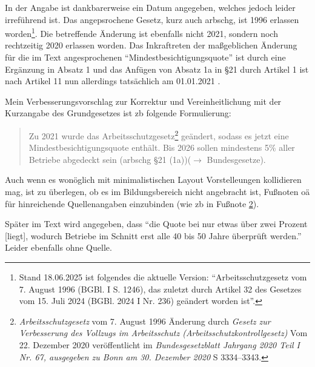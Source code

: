 In der Angabe ist dankbarerweise ein Datum angegeben, welches jedoch leider irreführend ist. Das angepsrochene Gesetz, kurz auch \gls{arbschg}, ist 1996 erlassen worden\footnote{Stand 18.06.2025 ist folgendes die aktuelle Version: \enquote{Arbeitsschutzgesetz vom 7. August 1996 (BGBl. I S. 1246), das zuletzt durch Artikel 32 des Gesetzes vom 15. Juli 2024 (BGBl. 2024 I Nr. 236) geändert worden ist}.}. Die betreffende Änderung ist ebenfalls nicht 2021, sondern noch rechtzeitig 2020 erlassen worden. Das Inkraftreten der maßgeblichen Änderung für die im Text angesprochenen \enquote{Mindestbesichtigungsquote} ist durch eine Ergänzung in Absatz 1 und das Anfügen von Absatz 1a in §21 %
durch Artikel 1 ist nach Artikel 11 nun allerdings tatsächlich am 01.01.2021 \autocite[3334–3343]{BGBl.2020-I-Nr67}. 

Mein Verbesserungsvorschlag zur Korrektur und Vereinheitlichung mit der Kurzangabe des Grundgesetzes ist \gls{zb} folgende Formulierung:
\begin{quote}
Zu 2021 wurde das Arbeitsschutzgesetz\footnote{
    \emph{Arbeitsschutzgesetz} vom 7. August 1996 Änderung durch \emph{Gesetz zur Verbesserung des Vollzugs im Arbeitsschutz (Arbeitsschutzkontrollgesetz)} Vom 22. Dezember 2020 veröffentlicht im \emph{Bundesgesetzblatt Jahrgang 2020 Teil I Nr. 67, ausgegeben zu Bonn am 30. Dezember 2020} \gls{S} 3334–3343.\label{ArbschSchGfooty}} 
    geändert, sodass es jetzt eine Mindestbesichtigungsquote enthält. %
    Bis 2026 sollen mindestens 5\% aller Betriebe abgedeckt sein (\gls{arbschg} §21 (1a))($\rightarrow$ Bundesgesetze). 
\end{quote}

Auch wenn es wonöglich mit minimalistischen Layout Vorstelleungen kollidieren mag, ist zu überlegen, ob es im Bildungsbereich nicht angebracht ist, Fußnoten \gls{oä} für hinreichende Quellenangaben einzubinden (wie \gls{zb} in Fußnote \ref{ArbschSchGfooty}). 


Später im Text wird angegeben, dass \enquote{die Quote bei nur etwas über zwei Prozent [liegt], wodurch Betriebe im Schnitt erst alle 40 bis 50 Jahre überprüft werden.} Leider ebenfalls ohne Quelle.




